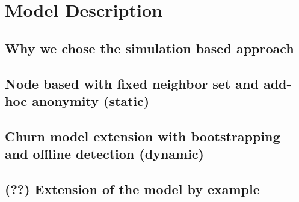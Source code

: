 \chapter{Model Description}

\section{Why we chose the simulation based approach}
\section{Node based with fixed neighbor set and add-hoc anonymity (static)}
\section{Churn model extension with bootstrapping and offline detection (dynamic)}
\section{(??) Extension of the model by example}
